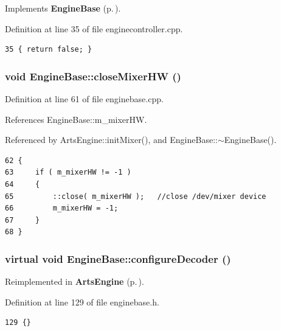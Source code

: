 Implements {\bf Engine\-Base} {\rm (p.\,\pageref{classEngineBase_EngineBasea4})}.

Definition at line 35 of file enginecontroller.cpp.



\footnotesize\begin{verbatim}35 { return false; }
\end{verbatim}\normalsize 
{}
\subsubsection{\setlength{\rightskip}{0pt plus 5cm}void Engine\-Base::close\-Mixer\-HW ()\hspace{0.3cm}{\tt  [protected, inherited]}}\label{classEngineBase_EngineBaseb0}




Definition at line 61 of file enginebase.cpp.

References Engine\-Base::m\_\-mixer\-HW.

Referenced by Arts\-Engine::init\-Mixer(), and Engine\-Base::$\sim$Engine\-Base().



\footnotesize\begin{verbatim}62 {
63     if ( m_mixerHW != -1 )
64     {
65         ::close( m_mixerHW );   //close /dev/mixer device
66         m_mixerHW = -1;
67     }
68 }
\end{verbatim}\normalsize 
{}
\subsubsection{\setlength{\rightskip}{0pt plus 5cm}virtual void Engine\-Base::configure\-Decoder ()\hspace{0.3cm}{\tt  [inline, virtual, slot, inherited]}}\label{classEngineBase_EngineBasei6}




Reimplemented in {\bf Arts\-Engine} {\rm (p.\,\pageref{classArtsEngine_ArtsEnginei6})}.

Definition at line 129 of file enginebase.h.



\footnotesize\begin{verbatim}129 {}
\end{verbatim}\normalsize 
{}
